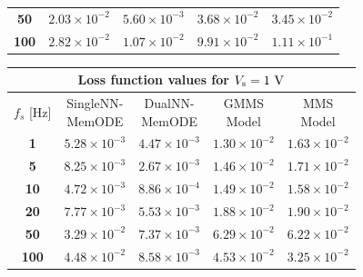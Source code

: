 \documentclass[a4,journal]{IEEEtran}
\newcommand{\Vs}{V_{\rm s}}
\newcommand{\MemODE}{MemODE}
\newcommand{\mtimes}{\!\times\!}
\begin{document}
\begin{table}[htbp]
\begin{tabular}{c|cccc}
\textbf{50} & \(2.03 \mtimes 10^{-2}\) & \color{ieeegreen} \bfseries \(5.60 \mtimes 10^{-3}\) & \color{ieeered} \bfseries \(3.68 \mtimes 10^{-2}\) & \(3.45 \mtimes 10^{-2}\) \\
\textbf{100} & \(2.82 \mtimes 10^{-2}\) & \color{ieeegreen} \bfseries \(1.07 \mtimes 10^{-2}\) & \(9.91 \mtimes 10^{-2}\) & \color{ieeered} \bfseries \(1.11 \mtimes 10^{-1}\) \\
    \bottomrule
  \end{tabular}
  \begin{tabular}{c|cccc}
    \toprule
    \multicolumn{5}{c}{\textbf{Loss function values for \(\Vs  = 1 \rm \ V\)}}    \\
    \midrule
    \(f_s\) [Hz] & \makecell{SingleNN-\\MemODE} & \makecell{DualNN-\\ MemODE} & \makecell{GMMS\\Model} & \makecell{MMS\\Model}\\ 
    \midrule
\cline{1-5}
\multicolumn{1}{|c|}{\textbf{1}} &  \(5.28 \mtimes 10^{-3}\)  &  \color{ieeegreen} \bfseries \(4.47 \mtimes 10^{-3}\)  &  \(1.30 \mtimes 10^{-2}\)  & \multicolumn{1}{c|}{\color{ieeered} \bfseries \(1.63 \mtimes 10^{-2}\) } \\
\cline{1-5}
\textbf{5} & \(8.25 \mtimes 10^{-3}\) & \color{ieeegreen} \bfseries \(2.67 \mtimes 10^{-3}\) & \(1.46 \mtimes 10^{-2}\) & \color{ieeered} \bfseries \(1.71 \mtimes 10^{-2}\) \\
\textbf{10} & \(4.72 \mtimes 10^{-3}\) & \color{ieeegreen} \bfseries \(8.86 \mtimes 10^{-4}\) & \(1.49 \mtimes 10^{-2}\) & \color{ieeered} \bfseries \(1.58 \mtimes 10^{-2}\) \\
\textbf{20} & \(7.77 \mtimes 10^{-3}\) & \color{ieeegreen} \bfseries \(5.53 \mtimes 10^{-3}\) & \(1.88 \mtimes 10^{-2}\) & \color{ieeered} \bfseries \(1.90 \mtimes 10^{-2}\) \\
\textbf{50} & \(3.29 \mtimes 10^{-2}\) & \color{ieeegreen} \bfseries \(7.37 \mtimes 10^{-3}\) & \color{ieeered} \bfseries \(6.29 \mtimes 10^{-2}\) & \(6.22 \mtimes 10^{-2}\) \\
\cline{1-5}
\multicolumn{1}{|c|}{\textbf{100}} &  \(4.48 \mtimes 10^{-2}\)  &  \color{ieeegreen} \bfseries \(8.58 \mtimes 10^{-3}\)  &  \color{ieeered} \bfseries \(4.53 \mtimes 10^{-2}\)  & \multicolumn{1}{c|}{\(3.25 \mtimes 10^{-2}\) } \\
\cline{1-5}
    \bottomrule
  \end{tabular}
  \begin{tabular}{c|cccc}

\end{tabular}
\end{table}
\end{document}
